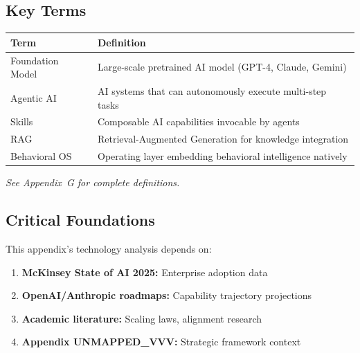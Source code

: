 
\subsection{Key Terms}

\begin{tabular}{@{}p{3cm}p{9cm}@{}}
\textbf{Term} & \textbf{Definition} \\
\hline
Foundation Model & Large-scale pretrained AI model (GPT-4, Claude, Gemini) \\
Agentic AI & AI systems that can autonomously execute multi-step tasks \\
Skills & Composable AI capabilities invocable by agents \\
RAG & Retrieval-Augmented Generation for knowledge integration \\
Behavioral OS & Operating layer embedding behavioral intelligence natively \\
\end{tabular}

\noindent\textit{See Appendix~G for complete definitions.}


\subsection{Critical Foundations}

\begin{tcolorbox}[colback=red!5!white, colframe=red!75!black,
    title=\textbf{Critical Foundations for Appendix UNMAPPED_VVV.0}]

This appendix's technology analysis depends on:

\begin{enumerate}
    \item \textbf{McKinsey State of AI 2025:} Enterprise adoption data
    \item \textbf{OpenAI/Anthropic roadmaps:} Capability trajectory projections
    \item \textbf{Academic literature:} Scaling laws, alignment research
    \item \textbf{Appendix UNMAPPED_VVV:} Strategic framework context
\end{enumerate}

\end{tcolorbox}

